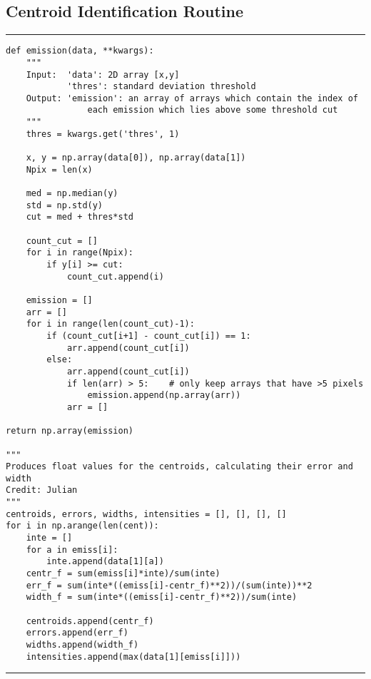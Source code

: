 \documentclass[preprint]{aastex62}
\begin{document}
\subsection{Centroid Identification Routine} \label{code:centroid}
\small
\hrule
\begin{lstlisting}
def emission(data, **kwargs):
    """
    Input:  'data': 2D array [x,y]
            'thres': standard deviation threshold
    Output: 'emission': an array of arrays which contain the index of 
                each emission which lies above some threshold cut
    """
    thres = kwargs.get('thres', 1)
    
    x, y = np.array(data[0]), np.array(data[1])
    Npix = len(x)
    
    med = np.median(y)
    std = np.std(y)
    cut = med + thres*std
    
    count_cut = []
    for i in range(Npix):
        if y[i] >= cut:
            count_cut.append(i)
    
    emission = []
    arr = []
    for i in range(len(count_cut)-1):
        if (count_cut[i+1] - count_cut[i]) == 1:
            arr.append(count_cut[i])
        else:
            arr.append(count_cut[i])
            if len(arr) > 5:    # only keep arrays that have >5 pixels
                emission.append(np.array(arr))
            arr = []

return np.array(emission)

"""
Produces float values for the centroids, calculating their error and width
Credit: Julian
"""
centroids, errors, widths, intensities = [], [], [], []
for i in np.arange(len(cent)):
    inte = []
    for a in emiss[i]:
        inte.append(data[1][a])
    centr_f = sum(emiss[i]*inte)/sum(inte)
    err_f = sum(inte*((emiss[i]-centr_f)**2))/(sum(inte))**2
    width_f = sum(inte*((emiss[i]-centr_f)**2))/sum(inte)
    
    centroids.append(centr_f)
    errors.append(err_f)
    widths.append(width_f)
    intensities.append(max(data[1][emiss[i]]))
\end{lstlisting}
\hrule \vspace{7pt}
\end{document}
